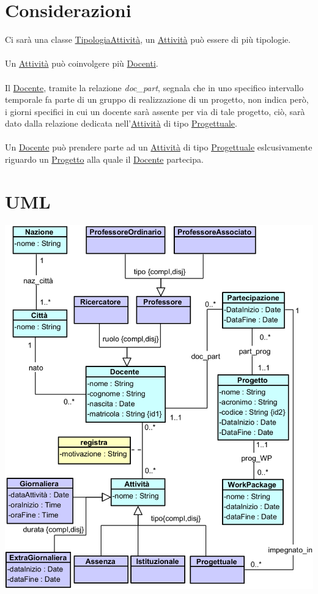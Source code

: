 \documentclass[12pt, letterpaper]{article}
\newcommand{\acc}{\\\hphantom{}\\}
\begin{document}
\section{Considerazioni}
Ci sarà una classe \underline{TipologiaAttività}, un \underline{Attività} può essere di 
più tipologie.\acc Un \underline{Attività} può coinvolgere più \underline{Docenti}.\acc 
Il \underline{Docente}, tramite la relazione \textit{doc\_part}, segnala che in uno specifico 
intervallo temporale fa parte di un gruppo di realizzazione di un progetto, non indica però, i giorni 
specifici in cui un docente sarà assente per via di tale progetto, ciò, sarà dato dalla 
relazione dedicata nell'\underline{Attività} di tipo \underline{Progettuale}.\acc 
Un \underline{Docente} può prendere parte ad un \underline{Attività} di tipo \underline{Progettuale} 
eslcusivamente riguardo un  \underline{Progetto} alla quale il \underline{Docente} partecipa.
\newpage
\section{UML}\begin{center}
    \includegraphics[width=1.1\textwidth]{images/UML.png}
\end{center}
\end{document}
